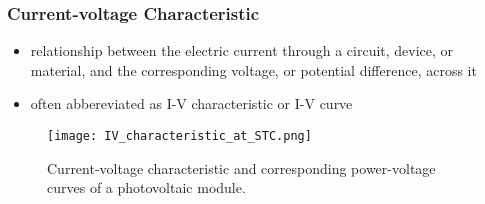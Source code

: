 \begin{frame}
    \frametitle{Current-voltage Characteristic}
    \small
    \begin{itemize}
        \item relationship between the electric current through a circuit,
        device, or material, and the corresponding voltage, or potential difference, across it
        \item often abbereviated as I-V characteristic or I-V curve
    \end{itemize}
    \begin{figure}
        \centering
        \texttt{[image: IV\_characteristic\_at\_STC.png]}
        \caption{\small Current-voltage characteristic and corresponding power-voltage curves of a photovoltaic module.}
    \end{figure}
\end{frame}